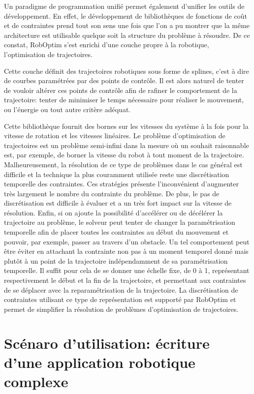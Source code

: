 Un paradigme de programmation unifié permet également d'unifier les
outils de développement. En effet, le développement de bibliothèques
de fonctions de coût et de contraintes prend tout son sens une fois
que l'on a pu montrer que la même architecture est utilisable quelque
soit la structure du problème à résoudre. De ce constat, RobOptim
s'est enrichi d'une couche propre à la robotique, l'optimisation de
trajectoires.

Cette couche définit des trajectoires robotiques sous forme de
splines, c'est à dire de courbes
paramétrées par des points de
contrôle. Il est alors naturel de tenter de
vouloir altérer ces points de contrôle afin de rafiner le comportement
de la trajectoire: tenter de minimiser le temps nécessaire pour
réaliser le mouvement, ou l'énergie ou tout autre critère adéquat.

Cette bibliothèque fournit des bornes sur les vitesses du système à la
fois pour la vitesse de rotation et les vitesses linéaires. Le
problème d'optimisation de trajectoires est un problème semi-infini
dans la mesure où un souhait raisonnable est, par exemple, de borner
la vitesse du robot à tout moment de la trajectoire. Malheureusement,
la résolution de ce type de problèmes dans le cas général est
difficile et la technique la plus couramment utilisée reste une
discrétisation temporelle des contraintes. Ces stratégies présente
l'inconvénient d'augmenter très largement le nombre du contrainte du
problème. De plus, le pas de discrétisation est difficile à évaluer et
a un très fort impact sur la vitesse de résolution. Enfin, si on
ajoute la possibilité d'accélérer ou de décélérer la trajectoire au
problème, le solveur peut tenter de changer la paramétrisation
temporelle afin de placer toutes les contraintes au début du mouvement
et pouvoir, par exemple, passer au travers d'un obstacle. Un tel
comportement peut être éviter en attachant la contrainte non pas à un
moment temporel donné mais plutôt à un point de la trajectoire
indépendamment de sa paramétrisation temporelle. Il suffit pour cela
de se donner une échelle fixe, de 0 à 1, représentant respectivement
le début et la fin de la trajectoire, et permettant aux contraintes de
se déplacer avec la reparamétrisation de la trajectoire. La
discrétisation de contraintes utilisant ce type de représentation est
supporté par RobOptim et permet de simplifier la résolution de
problèmes d'optimisation de trajectoires.


\section{Scénaro d'utilisation: écriture d'une application robotique complexe}


